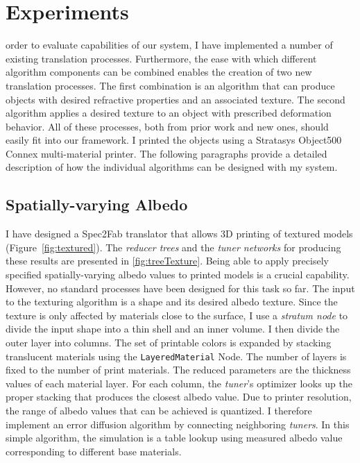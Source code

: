 \chapter{Experiments}
\label{chap:results}
 order to evaluate capabilities of our system, I have implemented a number of existing translation processes.
Furthermore, the ease with which different algorithm components can be combined enables the creation of two new translation processes.
The first combination is an algorithm that can produce objects with desired refractive properties and an associated texture.
The second algorithm applies a desired texture to an object with prescribed deformation behavior.
All of these processes, both from prior work and new ones, should easily fit into our framework. I printed the objects using a Stratasys Object500 Connex  multi-material printer.
The following paragraphs provide a detailed description of how the individual algorithms can be designed with my system.

\section{Spatially-varying Albedo}
I have designed a Spec2Fab translator that allows 3D printing of textured models (Figure~\ref{fig:textured}).
The \emph{reducer trees} and the \emph{tuner networks} for producing these results are presented in 
\autoref{fig:treeTexture}.
Being able to apply precisely specified spatially-varying albedo values to printed models is a crucial capability.
However, no standard processes have been designed for this task so far.
The input to the texturing algorithm is a shape and its desired albedo texture.
Since the texture is only affected by materials close to the surface,
I use a \emph{stratum node} to divide the input shape into a thin shell and an inner volume.
I then divide the outer layer into columns.
The set of printable colors is expanded by stacking translucent materials using the \verb|LayeredMaterial| Node.
The number of layers is fixed to the number of print materials.
The reduced parameters are the thickness values of each material layer.
For each column, the \emph{tuner}'s optimizer looks up the proper stacking that produces the closest albedo value.
Due to printer resolution, the range of albedo values that can be achieved is quantized.
I therefore implement an error diffusion algorithm by connecting neighboring \emph{tuners}.
In this simple algorithm, the simulation is a table lookup using measured albedo value corresponding to different base materials.

